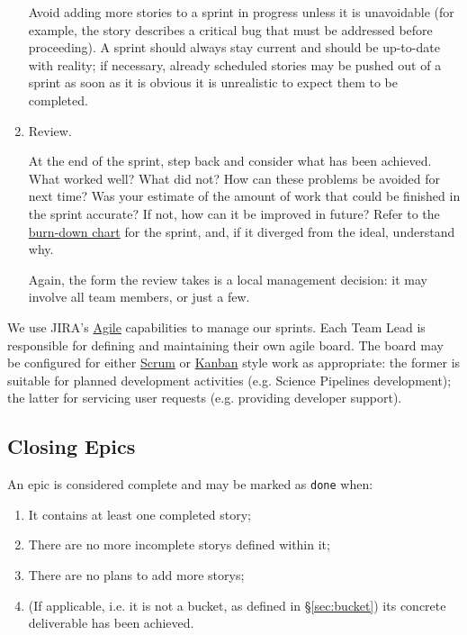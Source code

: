 \begin{enumerate}
  Avoid adding more stories to a sprint in progress unless it is
  unavoidable (for example, the \gls{story} describes a critical bug that must
  be addressed before proceeding). A sprint should always stay current
  and should be up-to-date with reality; if necessary, already scheduled
  stories may be pushed out of a sprint as soon as it is obvious it is
  unrealistic to expect them to be completed.
\item \gls{Review}.

  At the end of the sprint, step back and consider what has been
  achieved. What worked well? What did not? How can these problems be
  avoided for next time? Was your estimate of the amount of work that
  could be finished in the sprint accurate? If not, how can it be
  improved in future? Refer to the
  \href{https://en.wikipedia.org/wiki/Burn_down_chart}{burn-down chart}
  for the sprint, and, if it diverged from the ideal, understand why.

  Again, the form the review takes is a local management decision: it
  may involve all team members, or just a few.
\end{enumerate}

We use \gls{JIRA}'s
\href{https://www.atlassian.com/software/jira/agile}{Agile} capabilities
to manage our sprints. Each Team Lead is responsible for
defining and maintaining their own agile board. The board may be
configured for either
\href{https://en.wikipedia.org/wiki/Scrum_(software_development)}{Scrum}
or \href{https://en.wikipedia.org/wiki/Kanban_(development)}{Kanban}
style work as appropriate: the former is suitable for planned
development activities (e.g. \gls{Science Pipelines} development); the latter
for servicing user requests (e.g. providing developer support).

\subsection{Closing Epics}
\label{sec:epic-close}


An \gls{epic} is considered complete and may be marked as \texttt{done} when:

\begin{enumerate}
\item It contains at least one completed \gls{story};
\item There are no more incomplete \glspl{story} defined within it;
\item There are no plans to add more \glspl{story};
\item (If applicable, i.e. it is not a bucket, as defined in \S\ref{sec:bucket}) its concrete deliverable has been achieved.
\end{enumerate}

